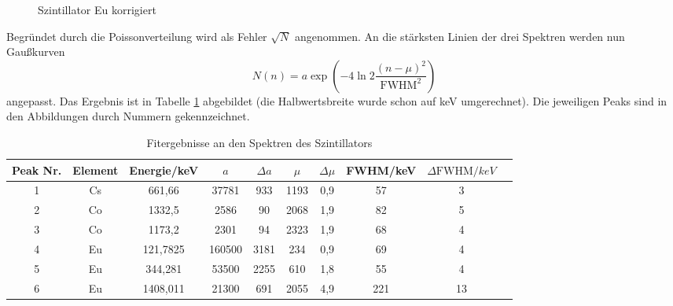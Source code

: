 \begin{figure}[!h]
\centering
{}
\caption{Szintillator Eu korrigiert}
\label{fig:si_eu}
\end{figure}

Begründet durch die Poissonverteilung wird als Fehler $\sqrt{N}$ angenommen. An die stärksten Linien der drei Spektren werden nun Gaußkurven \[N(n) = a\exp{\left(-4\ln{2}\frac{(n-\mu)^2}{\text{FWHM}^2}\right)}\] angepasst. Das Ergebnis ist in Tabelle \ref{tab:si} abgebildet (die Halbwertsbreite wurde schon auf keV umgerechnet). Die jeweiligen Peaks sind in den Abbildungen durch Nummern gekennzeichnet.

\begin{table}[h]
\caption{Fitergebnisse an den Spektren des Szintillators}
\begin{tabular}{cccccccccc}
\toprule
Peak Nr. & Element & Energie/\si{keV}& $a$ & $\Delta a$ & $\mu$ & $\Delta \mu$ & FWHM/\si{keV} & $\Delta \text{FWHM}/\si{keV}$\\
\midrule 
1	&	Cs	&	661,66	&	37781	&	933	&	1193	&	0,9	&	57	&	3\\
2	&	Co	&	1332,5	&	2586	&	90	&	2068	&	1,9	&	82	&	5\\
3	&	Co	&	1173,2	&	2301	&	94	&	2323	&	1,9	&	68	&	4\\
4	&	Eu	&	121,7825	&	160500	&	3181	&	234	&	0,9	&	69	&	4\\
5	&	Eu	&	344,281	&	53500	&	2255	&	610	&	1,8	&	55	&	4\\
6	&	Eu	&	1408,011	&	21300	&	691	&	2055	&	4,9	&	221	&	13\\
\bottomrule
\end{tabular}
\label{tab:si}
\end{table}

